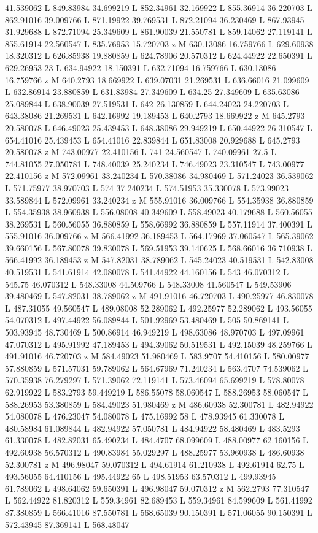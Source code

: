 {\begin{scope}[local bounding box=bb]
{41.539062 L 849.83984 34.699219 L 852.34961 32.169922 L 855.36914 36.220703 L 862.91016 39.009766 L 871.19922 39.769531 L 872.21094 36.230469 L 867.93945 31.929688 L 872.71094 25.349609 L 861.90039 21.550781 L 859.14062 27.119141 L 855.61914 22.560547 L 835.76953 15.720703 z M 630.13086 16.759766 L 629.60938 18.320312 L 626.85938 19.880859 L 624.78906 20.570312 L 624.44922 22.650391 L 629.26953 23 L 634.94922 18.150391 L 632.71094 16.759766 L 630.13086 16.759766 z M 640.2793 18.669922 L 639.07031 21.269531 L 636.66016 21.099609 L 632.86914 23.880859 L 631.83984 27.349609 L 634.25 27.349609 L 635.63086 25.089844 L 638.90039 27.519531 L 642 26.130859 L 644.24023 24.220703 L 643.38086 21.269531 L 642.16992 19.189453 L 640.2793 18.669922 z M 645.2793 20.580078 L 646.49023 25.439453 L 648.38086 29.949219 L 650.44922 26.310547 L 654.41016 25.439453 L 654.41016 22.839844 L 651.83008 20.929688 L 645.2793 20.580078 z M 743.00977 22.410156 L 741 24.560547 L 740.09961 27.5 L 744.81055 27.050781 L 748.40039 25.240234 L 746.49023 23.310547 L 743.00977 22.410156 z M 572.09961 33.240234 L 570.38086 34.980469 L 571.24023 36.539062 L 571.75977 38.970703 L 574 37.240234 L 574.51953 35.330078 L 573.99023 33.589844 L 572.09961 33.240234 z M 555.91016 36.009766 L 554.35938 36.880859 L 554.35938 38.960938 L 556.08008 40.349609 L 558.49023 40.179688 L 560.56055 38.269531 L 560.56055 36.880859 L 558.66992 36.880859 L 557.11914 37.400391 L 555.91016 36.009766 z M 566.41992 36.189453 L 564.17969 37.060547 L 565.39062 39.660156 L 567.80078 39.830078 L 569.51953 39.140625 L 568.66016 36.710938 L 566.41992 36.189453 z M 547.82031 38.789062 L 545.24023 40.519531 L 542.83008 40.519531 L 541.61914 42.080078 L 541.44922 44.160156 L 543 46.070312 L 545.75 46.070312 L 548.33008 44.509766 L 548.33008 41.560547 L 549.53906 39.480469 L 547.82031 38.789062 z M 491.91016 46.720703 L 490.25977 46.830078 L 487.31055 49.560547 L 489.08008 52.289062 L 492.25977 52.289062 L 493.56055 54.070312 L 497.44922 56.089844 L 501.92969 53.480469 L 505 50.869141 L 503.93945 48.730469 L 500.86914 46.949219 L 498.63086 48.970703 L 497.09961 47.070312 L 495.91992 47.189453 L 494.39062 50.519531 L 492.15039 48.259766 L 491.91016 46.720703 z M 584.49023 51.980469 L 583.9707 54.410156 L 580.00977 57.880859 L 571.57031 59.789062 L 564.67969 71.240234 L 563.4707 74.539062 L 570.35938 76.279297 L 571.39062 72.119141 L 573.46094 65.699219 L 578.80078 62.919922 L 583.2793 59.449219 L 586.55078 58.060547 L 588.26953 58.060547 L 588.26953 53.380859 L 584.49023 51.980469 z M 486.60938 52.300781 L 482.94922 54.080078 L 476.23047 54.080078 L 475.16992 58 L 478.93945 61.330078 L 480.58984 61.089844 L 482.94922 57.050781 L 484.94922 58.480469 L 483.5293 61.330078 L 482.82031 65.490234 L 484.4707 68.099609 L 488.00977 62.160156 L 492.60938 56.570312 L 490.83984 55.029297 L 488.25977 53.960938 L 486.60938 52.300781 z M 496.98047 59.070312 L 494.61914 61.210938 L 492.61914 62.75 L 493.56055 64.410156 L 495.44922 65 L 498.51953 63.570312 L 499.93945 61.789062 L 498.64062 59.650391 L 496.98047 59.070312 z M 562.2793 77.310547 L 562.44922 81.820312 L 559.34961 82.689453 L 559.34961 84.599609 L 561.41992 87.380859 L 566.41016 87.550781 L 568.65039 90.150391 L 571.06055 90.150391 L 572.43945 87.369141 L 568.48047 }
\end{scope}}
